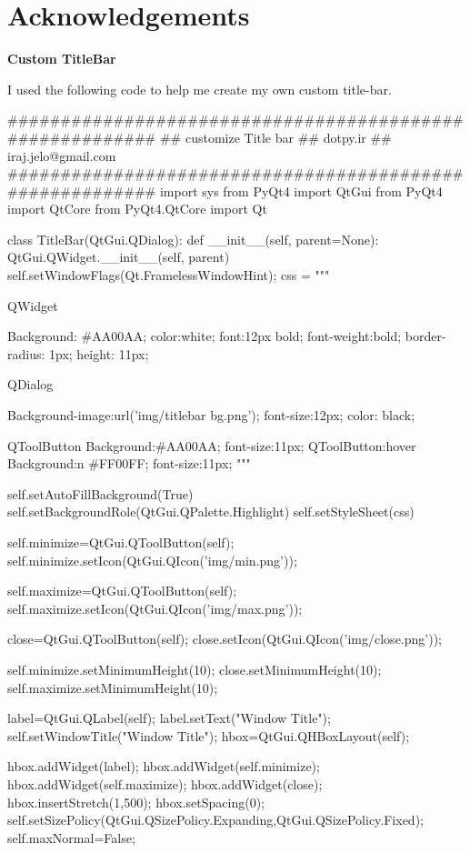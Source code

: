 \section{Acknowledgements}

\textbf{Custom TitleBar}


I used the following code to help me create my own custom title-bar.

\begin{python}
#########################################################
## customize Title bar
## dotpy.ir
## iraj.jelo@gmail.com
#########################################################
import sys
from PyQt4 import QtGui
from PyQt4 import QtCore
from PyQt4.QtCore import Qt


class TitleBar(QtGui.QDialog):
    def __init__(self, parent=None):
        QtGui.QWidget.__init__(self, parent)
        self.setWindowFlags(Qt.FramelessWindowHint);
        css = """

QWidget
{
Background: #AA00AA;
color:white;
font:12px bold;
font-weight:bold;
border-radius: 1px;
height: 11px;

}
QDialog{
Background-image:url('img/titlebar bg.png');
font-size:12px;
color: black;

}
QToolButton{
Background:#AA00AA;
font-size:11px;
}
QToolButton:hover{
Background:n #FF00FF;
font-size:11px;
}
"""

        self.setAutoFillBackground(True)
        self.setBackgroundRole(QtGui.QPalette.Highlight)
        self.setStyleSheet(css) 

        self.minimize=QtGui.QToolButton(self);
        self.minimize.setIcon(QtGui.QIcon('img/min.png'));

        self.maximize=QtGui.QToolButton(self);
        self.maximize.setIcon(QtGui.QIcon('img/max.png'));

        close=QtGui.QToolButton(self);
        close.setIcon(QtGui.QIcon('img/close.png'));

        self.minimize.setMinimumHeight(10);
        close.setMinimumHeight(10);
        self.maximize.setMinimumHeight(10);

        label=QtGui.QLabel(self);
        label.setText("Window Title");
        self.setWindowTitle("Window Title");
        hbox=QtGui.QHBoxLayout(self);

        hbox.addWidget(label);
        hbox.addWidget(self.minimize);
        hbox.addWidget(self.maximize);
        hbox.addWidget(close);
        hbox.insertStretch(1,500);
        hbox.setSpacing(0);
        self.setSizePolicy(QtGui.QSizePolicy.Expanding,QtGui.QSizePolicy.Fixed);
        self.maxNormal=False;


\end{python}
